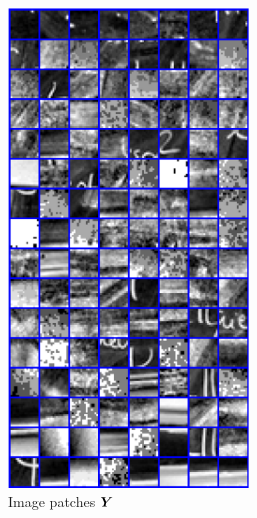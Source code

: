 \begin{figure}[!ht]
\begin{subfigure}[b]{0.29\textwidth}
	\includegraphics[width=0.7\textwidth]{figures/ksvd/patches.pdf}
	\caption{Image patches $\bm{Y}$}
\end{subfigure}
\begin{subfigure}[b]{0.29\textwidth}\centering

\end{subfigure}
\end{figure}
